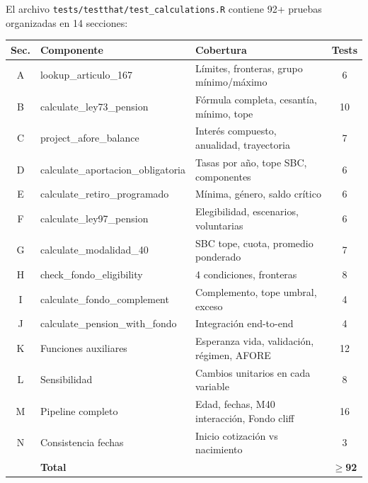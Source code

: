\documentclass[11pt,a4paper]{report}
\begin{document}
\begin{tcolorbox}[colback=blue!5!white, colframe=blue!75!black, title=\textbf{Definici\'on Formal: Estructura del Suite de Tests}, breakable]
El archivo \texttt{tests/testthat/test\_calculations.R} contiene 92+ pruebas organizadas en 14 secciones:

\begin{center}
\begin{tabular}{clp{6cm}c}
\toprule
\textbf{Sec.} & \textbf{Componente} & \textbf{Cobertura} & \textbf{Tests} \\
\midrule
A & lookup\_articulo\_167 & L\'imites, fronteras, grupo m\'inimo/m\'aximo & 6 \\
B & calculate\_ley73\_pension & F\'ormula completa, cesant\'ia, m\'inimo, tope & 10 \\
C & project\_afore\_balance & Inter\'es compuesto, anualidad, trayectoria & 7 \\
D & calculate\_aportacion\_obligatoria & Tasas por a\~no, tope SBC, componentes & 6 \\
E & calculate\_retiro\_programado & M\'inima, g\'enero, saldo cr\'itico & 6 \\
F & calculate\_ley97\_pension & Elegibilidad, escenarios, voluntarias & 6 \\
G & calculate\_modalidad\_40 & SBC tope, cuota, promedio ponderado & 7 \\
H & check\_fondo\_eligibility & 4 condiciones, fronteras & 8 \\
I & calculate\_fondo\_complement & Complemento, tope umbral, exceso & 4 \\
J & calculate\_pension\_with\_fondo & Integraci\'on end-to-end & 4 \\
K & Funciones auxiliares & Esperanza vida, validaci\'on, r\'egimen, AFORE & 12 \\
L & Sensibilidad & Cambios unitarios en cada variable & 8 \\
M & Pipeline completo & Edad, fechas, M40 interacci\'on, Fondo cliff & 16 \\
N & Consistencia fechas & Inicio cotizaci\'on vs nacimiento & 3 \\
\midrule
  & \textbf{Total} & & \textbf{$\geq$92} \\
\bottomrule
\end{tabular}
\end{center}
\end{tcolorbox}
\end{document}
